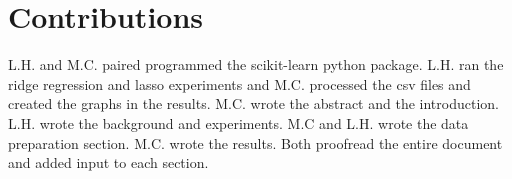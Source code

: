 
\section{Contributions}
\label{sec:contrib}

L.H. and M.C. paired programmed the scikit-learn python package.
L.H. ran the ridge regression and lasso experiments and M.C.
processed the csv files and created the graphs in the results. 
M.C. wrote the abstract and the introduction. L.H. wrote the background
and experiments. M.C and L.H. wrote the data preparation section. M.C. wrote the results. Both proofread the entire document and added input to each section.
